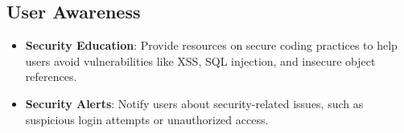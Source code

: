 \subsection{User Awareness}
\begin{itemize}
	\item \textbf{Security Education}: Provide resources on secure coding practices to help users avoid vulnerabilities like XSS, SQL injection, and insecure object references.
	\item \textbf{Security Alerts}: Notify users about security-related issues, such as suspicious login attempts or unauthorized access.
\end{itemize}





